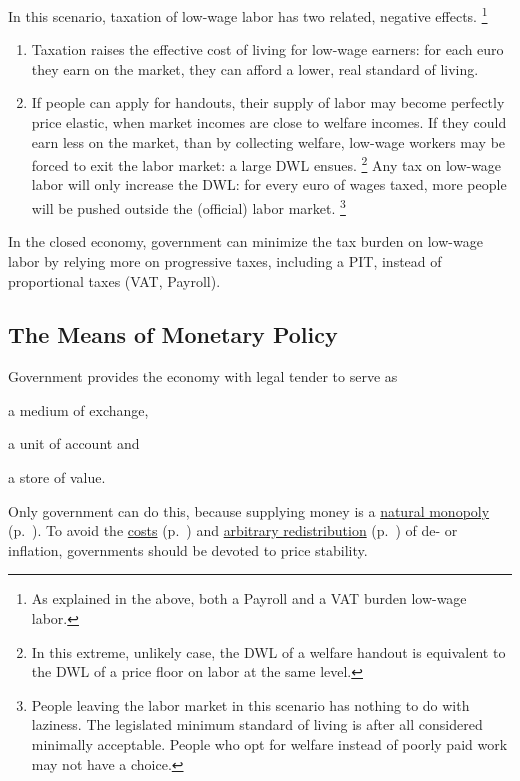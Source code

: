 In this scenario, taxation of low-wage labor has two related, negative effects.
\footnote{
	As explained in the above, both a \gls{Payroll} and a \gls{VAT} burden low-wage labor.
}

\begin{enumerate}
	\item Taxation raises the effective cost of living for low-wage earners:
	for each euro they earn on the market, they can afford a lower, real standard of living.

	\item If people can apply for handouts, their supply of labor may become perfectly price elastic, when market incomes are close to welfare incomes.
	If they could earn less on the market, than by collecting welfare, low-wage workers may be forced to exit the labor market:
	a large \gls{DWL} ensues.
	\footnote{
		In this extreme, unlikely case, the \gls{DWL} of a welfare handout is equivalent to the \gls{DWL} of a price floor on labor at the same level.
	}
	Any tax on low-wage labor will only increase the \gls{DWL}:
	for every euro of wages taxed, more people will be pushed outside the (official) labor market.
	\footnote{
		People leaving the labor market in this scenario has nothing to do with laziness.
		The legislated minimum standard of living is after all considered minimally acceptable.
		People who opt for welfare instead of poorly paid work may not have a choice.
	}
\end{enumerate}

In the closed economy, government can minimize the tax burden on low-wage labor by relying more on progressive taxes, including a \gls{PIT}, instead of proportional taxes (\gls{VAT}, \gls{Payroll}).


\subsection[Monetary Policy]{The Means of Monetary Policy}
	\label{sec:monetary}
Government provides the economy with legal tender to serve as
\begin{inparaenum}
	\item a medium of exchange,
	\item a unit of account and
	\item a store of value.
\end{inparaenum}

Only government can do this, because supplying money is a \hyperref[sec:natural-monopoly]{natural monopoly} (p.~\pageref{sec:natural-monopoly}).
To avoid the \hyperref[sec:price-stability]{costs} (p.~\pageref{sec:price-stability}) and  \hyperref[sec:distributive-effects-of-inflation]{arbitrary redistribution} (p.~\pageref{sec:distributive-effects-of-inflation}) of de- or inflation,
governments should be devoted to price stability.

